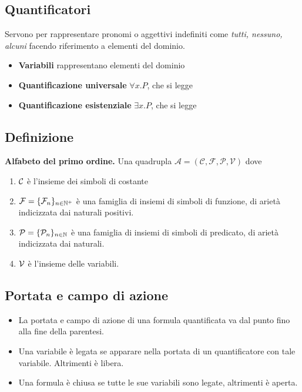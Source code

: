 \documentclass{article}
\begin{document}
\subsection*{Quantificatori}
Servono per rappresentare pronomi o aggettivi indefiniti come \emph{tutti, nessuno, alcuni} facendo riferimento a elementi del dominio.
\begin{itemize}
    \item \textbf{Variabili} rappresentano elementi del dominio
    \item \textbf{Quantificazione universale} \(\forall x . P\), che si legge 
    \item \textbf{Quantificazione esistenziale} \(\exists x . P\), che si legge 
\end{itemize}
\subsection*{Definizione}
\textbf{Alfabeto del primo ordine. } Una quadrupla \(\mathcal{A} = (\mathcal{C,F,P,V})\) dove
\begin{enumerate}
    \item \(\mathcal{C}\) è l'insieme dei simboli di costante
    \item \(\mathcal{F} = \{\mathcal{F}_n\}_{n \in \mathbb{N}^+}\) è una famiglia di insiemi di simboli di funzione, di arietà indicizzata dai naturali positivi.
    \item \(\mathcal{P} = \{\mathcal{P}_n\}_{n \in \mathbb{N}}\) è una famiglia di insiemi di simboli di predicato, di arietà indicizzata dai naturali.
    \item \(\mathcal{V}\) è l'insieme delle variabili.
\end{enumerate}
\subsection*{Portata e campo di azione}
\begin{itemize}
    \item La portata e campo di azione di una formula quantificata va dal punto fino alla fine della parentesi.
    \item Una variabile è legata se apparare nella portata di un quantificatore con tale variabile. Altrimenti è libera.
    \item Una formula è chiusa se tutte le sue variabili sono legate, altrimenti è aperta.
\end{itemize}
\end{document}
